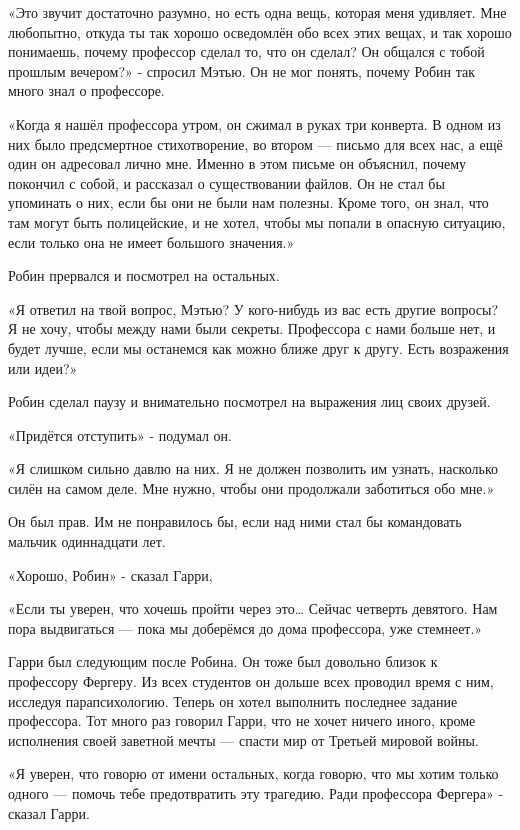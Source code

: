 \documentclass[a5paper, 9pt,
final, openany, twoside=true]{memoir}
\begin{document}
«Это звучит достаточно разумно, но есть одна вещь, которая меня удивляет. Мне любопытно, откуда ты так хорошо осведомлён обо всех этих вещах, и так хорошо понимаешь, почему профессор сделал то, что он сделал? Он общался с тобой прошлым вечером?» - спросил Мэтью. Он не мог понять, почему Робин так много знал о профессоре.

«Когда я нашёл профессора утром, он сжимал в руках три конверта. В одном из них было предсмертное стихотворение, во втором — письмо для всех нас, а ещё один он адресовал лично мне. Именно в этом письме он объяснил, почему покончил с собой, и рассказал о существовании файлов. Он не стал бы упоминать о них, если бы они не были нам полезны. Кроме того, он знал, что там могут быть полицейские, и не хотел, чтобы мы попали в опасную ситуацию, если только она не имеет большого значения.»

Робин прервался и посмотрел на остальных.

«Я ответил на твой вопрос, Мэтью? У кого-нибудь из вас есть другие вопросы? Я не хочу, чтобы между нами были секреты. Профессора с нами больше нет, и будет лучше, если мы останемся как можно ближе друг к другу. Есть возражения или идеи?»

Робин сделал паузу и внимательно посмотрел на выражения лиц своих друзей.

«Придётся отступить» - подумал он.

«Я слишком сильно давлю на них. Я не должен позволить им узнать, насколько силён на самом деле. Мне нужно, чтобы они продолжали заботиться обо мне.»

Он был прав. Им не понравилось бы, если над ними стал бы командовать мальчик одиннадцати лет.

«Хорошо, Робин» - сказал Гарри,

«Если ты уверен, что хочешь пройти через это… Сейчас четверть девятого. Нам пора выдвигаться — пока мы доберёмся до дома профессора, уже стемнеет.»

Гарри был следующим после Робина. Он тоже был довольно близок к профессору Фергеру. Из всех студентов он дольше всех проводил время с ним, исследуя парапсихологию. Теперь он хотел выполнить последнее задание профессора. Тот много раз говорил Гарри, что не хочет ничего иного, кроме исполнения своей заветной мечты — спасти мир от Третьей мировой войны.\bigskip

«Я уверен, что говорю от имени остальных, когда говорю, что мы хотим только одного — помочь тебе предотвратить эту трагедию. Ради профессора Фергера» - сказал Гарри.
\end{document}
